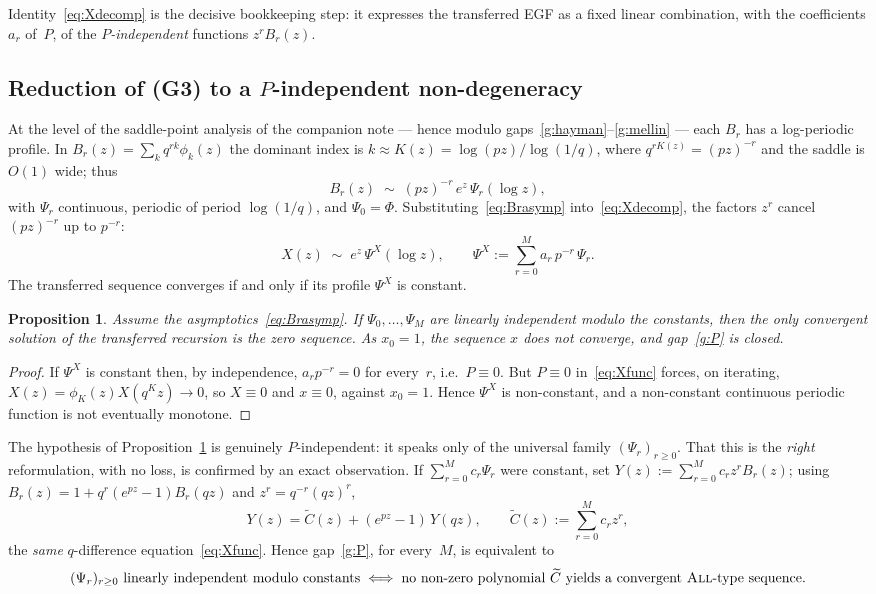 \documentclass[11pt]{article}
\newtheorem{proposition}[theorem]{Proposition}
\theoremstyle{definition}
\newcommand{\All}{\textsc{All}}
\begin{document}
Identity~\eqref{eq:Xdecomp} is the decisive bookkeeping step: it
expresses the transferred EGF as a fixed linear combination, with the
coefficients $a_r$ of~$P$, of the \emph{$P$-independent} functions
$z^rB_r(z)$.

\subsection{Reduction of (G3) to a $P$-independent non-degeneracy}

At the level of the saddle-point analysis of the companion note ---
hence modulo gaps~\ref{g:hayman}--\ref{g:mellin} --- each $B_r$ has a
log-periodic profile. In $B_r(z)=\sum_kq^{rk}\phi_k(z)$ the dominant
index is $k\approx K(z)=\log(pz)/\log(1/q)$, where
$q^{rK(z)}=(pz)^{-r}$ and the saddle is $O(1)$ wide; thus
\begin{equation}\label{eq:Brasymp}
  B_r(z)\;\sim\;(pz)^{-r}\,e^{z}\,\Psi_r(\log z),
\end{equation}
with $\Psi_r$ continuous, periodic of period $\log(1/q)$, and
$\Psi_0=\Phi$. Substituting~\eqref{eq:Brasymp} into~\eqref{eq:Xdecomp},
the factors $z^r$ cancel $(pz)^{-r}$ up to $p^{-r}$:
\begin{equation}\label{eq:Xprofile}
  X(z)\;\sim\;e^{z}\,\Psi^X(\log z),
  \qquad
  \Psi^X:=\sum_{r=0}^M a_r\,p^{-r}\,\Psi_r .
\end{equation}
The transferred sequence converges if and only if its profile $\Psi^X$
is constant.

\begin{proposition}\label{prop:G3red}
  Assume the asymptotics~\eqref{eq:Brasymp}. If $\Psi_0,\dots,\Psi_M$
  are linearly independent modulo the constants, then the only
  convergent solution of the transferred recursion is the zero
  sequence. As $x_0=1$, the sequence $x$ does not converge, and
  gap~\ref{g:P} is closed.
\end{proposition}

\begin{proof}
  If $\Psi^X$ is constant then, by independence, $a_rp^{-r}=0$ for
  every~$r$, i.e.\ $P\equiv0$. But $P\equiv0$ in~\eqref{eq:Xfunc}
  forces, on iterating, $X(z)=\phi_K(z)X(q^Kz)\to0$, so $X\equiv0$ and
  $x\equiv0$, against $x_0=1$. Hence $\Psi^X$ is non-constant, and a
  non-constant continuous periodic function is not eventually
  monotone.
\end{proof}

The hypothesis of Proposition~\ref{prop:G3red} is genuinely
$P$-independent: it speaks only of the universal family
$(\Psi_r)_{r\ge0}$. That this is the \emph{right} reformulation, with
no loss, is confirmed by an exact observation. If $\sum_{r=0}^M
c_r\Psi_r$ were constant, set $Y(z):=\sum_{r=0}^M c_rz^rB_r(z)$;
using $B_r(z)=1+q^r(e^{pz}-1)B_r(qz)$ and $z^r=q^{-r}(qz)^r$,
\[
  Y(z)=\widetilde C(z)+(e^{pz}-1)\,Y(qz),
  \qquad \widetilde C(z):=\sum_{r=0}^M c_rz^r,
\]
the \emph{same} $q$-difference equation~\eqref{eq:Xfunc}. Hence
gap~\ref{g:P}, for every~$M$, is equivalent to
\[
  (\Psi_r)_{r\ge0}\ \text{linearly independent modulo constants}
  \iff
  \text{no non-zero polynomial }\widetilde C\text{ yields a convergent
  \All-type sequence.}
\]
\end{document}
